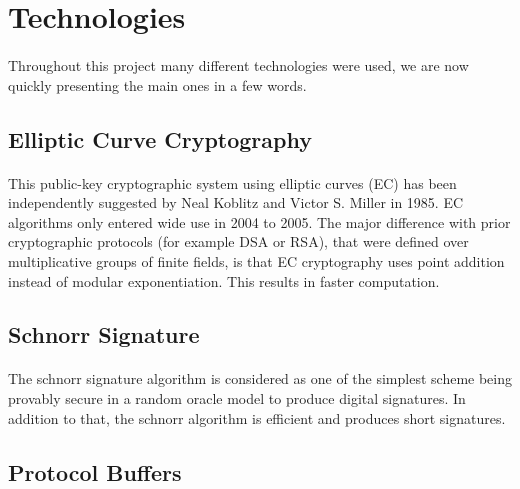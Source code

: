 \section{Technologies}

\paragraph{}
Throughout this project many different technologies were used, we are now quickly presenting the main ones in a few words.

\subsection[Elliptic Curve Cryptography]{Elliptic Curve Cryptography\raisebox{.3\baselineskip}{\normalsize\footnotemark}}

\paragraph{}
This public-key cryptographic system using elliptic curves (EC) has been independently suggested by Neal Koblitz and Victor S. Miller in 1985. EC algorithms only entered wide use in 2004 to 2005. The major difference with prior cryptographic protocols (for example DSA or RSA), that were defined over multiplicative groups of finite fields, is that EC cryptography uses point addition instead of modular exponentiation. This results in faster computation.

\subsection[Schnorr Signature]{Schnorr Signature\raisebox{.3\baselineskip}{\normalsize\footnotemark}}

\paragraph{}
The schnorr signature algorithm is considered as one of the simplest scheme being provably secure in a random oracle model to produce digital signatures. In addition to that, the schnorr algorithm is efficient and produces short signatures.

\subsection[Protocol Buffers]{Protocol Buffers\raisebox{.3\baselineskip}{\normalsize\footnotemark}}

